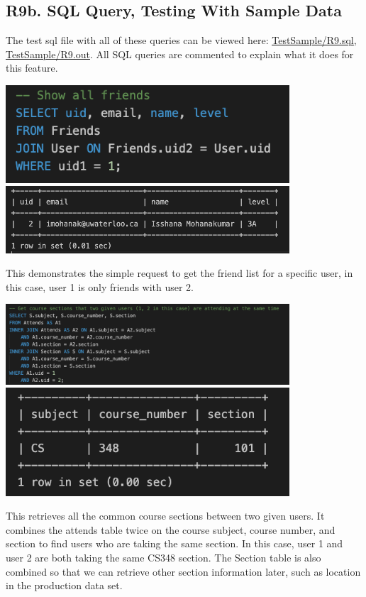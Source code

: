 \documentclass[12pt, a4paper]{article}
\begin{document}
\subsection*{R9b. SQL Query, Testing With Sample Data}
The test sql file with all of these queries can be viewed here: \underline{\href{https://github.com/Kggupta/DegreeMap/tree/main/Database/Queries/TestSample}{TestSample/R9.sql}}, \underline{\href{https://github.com/Kggupta/DegreeMap/tree/main/Database/Queries/TestSample}{TestSample/R9.out}}. All SQL queries are commented to explain what it does for this feature.
\begin{center}
    \includegraphics[width=400px]{R9/q1}
    \includegraphics[width=400px]{R9/q1out}
\end{center}
This demonstrates the simple request to get the friend list for a specific user, in this case, user 1 is only friends with user 2.
\begin{center}
    \includegraphics[width=400px]{R9/q2}
    \includegraphics[width=400px]{R9/q2out}
\end{center}
This retrieves all the common course sections between two given users. It combines the attends table twice on the course subject, course number, and section to find users who are taking the same section. In this case, user 1 and user 2 are both taking the same CS348 section. The Section table is also combined so that we can retrieve other section information later, such as location in the production data set.
\end{document}

